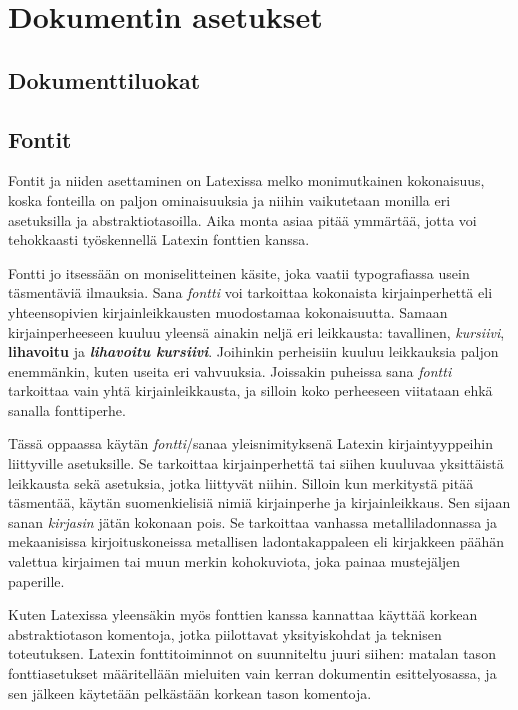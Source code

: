 \chapter{Dokumentin asetukset}
\section{Dokumenttiluokat}
\label{luku:dokumenttiluokat}
\section{Fontit}
\label{luku:kirjaintyypit}

Fontit ja niiden asettaminen on Latexissa melko monimutkainen
kokonaisuus, koska fonteilla on paljon ominaisuuksia ja niihin
vaikutetaan monilla eri asetuksilla ja abstraktiotasoilla. Aika monta
asiaa pitää ymmärtää, jotta voi tehokkaasti työskennellä Latexin
fonttien kanssa.

Fontti jo itsessään on moniselitteinen käsite, joka vaatii typografiassa
usein täsmentäviä ilmauksia. Sana \emph{fontti} voi tarkoittaa
kokonaista kirjainperhettä eli yhteensopivien kirjainleikkausten
muodostamaa kokonaisuutta. Samaan kirjainperheeseen kuuluu yleensä
ainakin neljä eri leikkausta: tavallinen, \textit{kursiivi},
\textbf{lihavoitu} ja \textbf{\textit{lihavoitu kursiivi}}. Joihinkin
perheisiin kuuluu leikkauksia paljon enemmänkin, kuten useita eri
vahvuuksia. Joissakin puheissa sana \emph{fontti} tarkoittaa vain yhtä
kirjainleikkausta, ja silloin koko perheeseen viitataan ehkä sanalla
fonttiperhe.

Tässä oppaassa käytän \emph{fontti}\-/sanaa yleisnimityksenä Latexin
kirjaintyyppeihin liittyville asetuksille. Se tarkoittaa kirjainperhettä
tai siihen kuuluvaa yksittäistä leikkausta sekä asetuksia, jotka
liittyvät niihin. Silloin kun merkitystä pitää täsmentää, käytän
suomenkielisiä nimiä kirjainperhe ja kirjainleikkaus. Sen sijaan sanan
\emph{kirjasin} jätän kokonaan pois. Se tarkoittaa vanhassa
metalliladonnassa ja mekaanisissa kirjoituskoneissa metallisen
ladontakappaleen eli kirjakkeen päähän valettua kirjaimen tai muun
merkin kohokuviota, joka painaa mustejäljen paperille.

Kuten Latexissa yleensäkin myös fonttien kanssa kannattaa käyttää
korkean abstraktiotason komentoja, jotka piilottavat yksityiskohdat ja
teknisen toteutuksen. Latexin fonttitoiminnot on suunniteltu juuri
siihen: matalan tason font\-ti\-ase\-tuk\-set määritellään mieluiten
vain kerran dokumentin esittelyosassa, ja sen jälkeen käytetään
pelkästään korkean tason komentoja.

